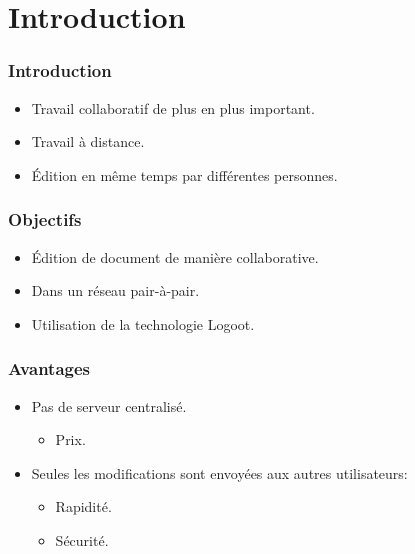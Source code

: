 \section{Introduction}
  \begin{frame}
    \frametitle{Introduction}
    \begin{itemize}
      \item Travail collaboratif de plus en plus important.
      \item Travail à distance.
      \item Édition en même temps par différentes personnes.
    \end{itemize}
  \end{frame}
  
  \begin{frame}
    \frametitle{Objectifs}
    \begin{itemize}
      \item Édition de document de manière collaborative.
      \item Dans un réseau pair-à-pair.
      \item Utilisation de la technologie Logoot.
    \end{itemize}
  \end{frame}

\begin{frame}
    \frametitle{Avantages}
    \begin{itemize}
      \item Pas de serveur centralisé.
      \begin{itemize}
      	\item Prix.
      \end{itemize}
      \item Seules les modifications sont envoyées aux autres utilisateurs:
      \begin{itemize}
      	\item Rapidité.
      	\item Sécurité.
      \end{itemize}
    \end{itemize}
  \end{frame}
